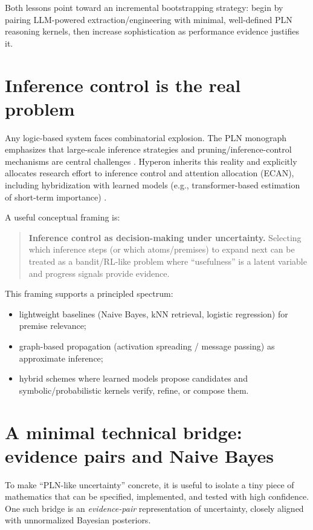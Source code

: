 \documentclass[11pt]{article}
\begin{document}
Both lessons point toward an incremental bootstrapping strategy: begin by pairing
LLM-powered extraction/engineering with minimal, well-defined PLN reasoning kernels, then
increase sophistication as performance evidence justifies it.

\section{Inference control is the real problem}

Any logic-based system faces combinatorial explosion. The PLN monograph emphasizes that large-scale
inference strategies and pruning/inference-control mechanisms are central challenges
\cite{pln-book}. Hyperon inherits this reality and explicitly allocates research effort to inference
control and attention allocation (ECAN), including hybridization with learned models
(e.g., transformer-based estimation of short-term importance) \cite{hyperon-plan,hyperon-overview}.

A useful conceptual framing is:

\begin{quote}
\textbf{Inference control as decision-making under uncertainty.}
Selecting which inference steps (or which atoms/premises) to expand next can be treated as a
bandit/RL-like problem where ``usefulness'' is a latent variable and progress signals provide evidence.
\end{quote}

This framing supports a principled spectrum:

\begin{itemize}[leftmargin=*]
\item lightweight baselines (Naive Bayes, kNN retrieval, logistic regression) for premise relevance;
\item graph-based propagation (activation spreading / message passing) as approximate inference;
\item hybrid schemes where learned models propose candidates and symbolic/probabilistic kernels verify,
refine, or compose them.
\end{itemize}

\section{A minimal technical bridge: evidence pairs and Naive Bayes}

To make ``PLN-like uncertainty'' concrete, it is useful to isolate a tiny piece of mathematics that can be
specified, implemented, and tested with high confidence.
One such bridge is an \emph{evidence-pair} representation of uncertainty, closely aligned with unnormalized
Bayesian posteriors.
\end{document}
